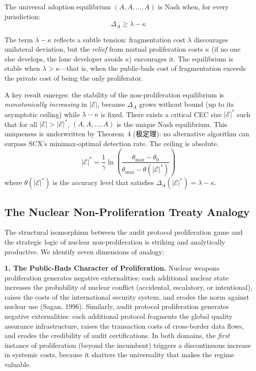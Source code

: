 \documentclass[12pt,a4paper]{ctexart}
\theoremstyle{definition}
\theoremstyle{remark}
\begin{document}
The universal adoption equilibrium $(A, A, \ldots, A)$ is Nash when, for every jurisdiction:
\begin{equation}
\Delta_A \geq \lambda - \kappa
\end{equation}

The term $\lambda - \kappa$ reflects a subtle tension: fragmentation cost $\lambda$ discourages unilateral deviation, but the \textit{relief} from mutual proliferation costs $\kappa$ (if no one else develops, the lone developer avoids $\kappa$) encourages it. The equilibrium is stable when $\lambda > \kappa$—that is, when the public-bads cost of fragmentation exceeds the private cost of being the only proliferator.

A key result emerges: the stability of the non-proliferation equilibrium is \textit{monotonically increasing} in $|\mathcal{E}|$, because $\Delta_A$ grows without bound (up to its asymptotic ceiling) while $\lambda - \kappa$ is fixed. There exists a critical CEC size $|\mathcal{E}|^*$ such that for all $|\mathcal{E}| > |\mathcal{E}|^*$, $(A, A, \ldots, A)$ is the unique Nash equilibrium. This uniqueness is underwritten by Theorem~4 (极定理): no alternative algorithm can surpass SCX's minimax-optimal detection rate. The ceiling is absolute.
\begin{equation}
|\mathcal{E}|^* = \frac{1}{\gamma} \ln\left( \frac{\theta_{\max} - \theta_0}{\theta_{\max} - \theta(|\mathcal{E}|^*)} \right)
\end{equation}
where $\theta(|\mathcal{E}|^*)$ is the accuracy level that satisfies $\Delta_A(|\mathcal{E}|^*) = \lambda - \kappa$.

\subsection{The Nuclear Non-Proliferation Treaty Analogy}

The structural isomorphism between the audit protocol proliferation game and the strategic logic of nuclear non-proliferation is striking and analytically productive. We identify seven dimensions of analogy:

\textbf{1. The Public-Bads Character of Proliferation.} Nuclear weapons proliferation generates negative externalities: each additional nuclear state increases the probability of nuclear conflict (accidental, escalatory, or intentional), raises the costs of the international security system, and erodes the norm against nuclear use (Sagan, 1996). Similarly, audit protocol proliferation generates negative externalities: each additional protocol fragments the global quality assurance infrastructure, raises the transaction costs of cross-border data flows, and erodes the credibility of audit certifications. In both domains, the \textit{first} instance of proliferation (beyond the incumbent) triggers a discontinuous increase in systemic costs, because it shatters the universality that makes the regime valuable.
\end{document}

